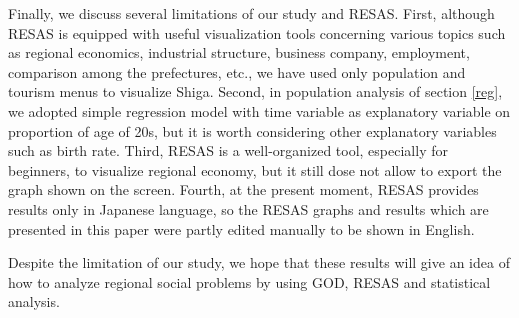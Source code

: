 \documentclass[10pt, conference, compsocconf]{IEEEtran}
\begin{document}
Finally, we discuss several limitations of our study and RESAS.
First, although RESAS is equipped with useful visualization tools concerning various topics such as regional economics, industrial structure, business company, employment, comparison among the prefectures, etc., we have used only population and tourism menus to visualize Shiga. Second, in population analysis of section \ref{reg}, we adopted simple regression model with time variable as explanatory variable on proportion of age of 20s, but it is worth considering other explanatory variables such as birth rate.
Third, RESAS is a well-organized tool, especially for beginners, to  visualize regional economy, but it still dose not allow to export the graph shown on the screen. Fourth, at the present moment, RESAS provides results only in Japanese language, so the RESAS graphs and results which are presented in this paper were partly edited manually to be shown in English.

Despite the limitation of our study, we hope that these results will give an idea of how to analyze regional social problems by using GOD, RESAS and statistical analysis.


\end{document}
